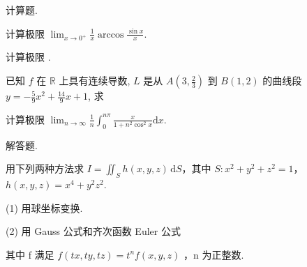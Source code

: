 \par{}
计算题.\par
计算极限 $\lim_{x\to 0^{+}}\frac{1}{x}\arccos \frac{\sin x}{x}.$\par
计算极限 .\par
\par{}
已知 $f$ 在 $\mathbb{R}$ 上具有连续导数, $L$ 是从 $A\left(3, \frac{2}{3}\right)$ 到 $B(1, 2)$ 的曲线段 $y = -\frac{5}{9} x^2 + \frac{14}{9} x + 1$, 求\par
\nopagebreak[4]
计算极限 $\lim_{n\to \infty}\frac{1}{n}\int_0^{n\pi}\frac{x}{1 + n^2\cos^2x}\mathrm{d}x.$\par
\par{}
解答题.\par
用下列两种方法求 $I = \iint_{S} h(x, y, z) \, \mathrm{d}S$，其中 $S: x^2 + y^2 + z^2 = 1$，$h(x, y, z) = x^4 + y^2 z^2$.\par
(1) 用球坐标变换.\par
\par{}
(2) 用 Gauss 公式和齐次函数 Euler 公式\par
\nopagebreak[4]
其中 f 满足  $f(tx,ty,tz)=t^{n}f(x,y,z)$ ，n 为正整数.\par
